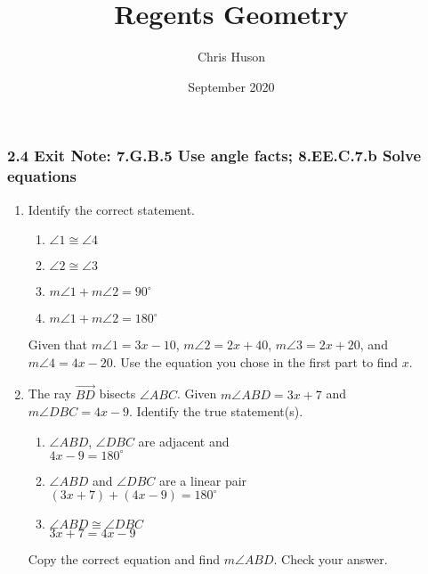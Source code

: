 \documentclass[12pt, twoside]{article}
\title{Regents Geometry}
\author{Chris Huson}
\date{September 2020}
\begin{document}
\subsubsection*{2.4 Exit Note: 7.G.B.5 Use angle facts; 8.EE.C.7.b Solve equations}
\begin{enumerate}
\item Identify the correct statement.
  \begin{multicols}{2}
    \begin{enumerate}
      \item $\angle 1 \cong \angle 4$
      \item $\angle 2 \cong \angle 3$
      \item $m\angle 1 + m\angle 2=90^\circ$
      \item $m\angle 1 + m\angle 2=180^\circ$
  \end{enumerate}
  \begin{center}
  \end{center}
\end{multicols} 
Given that $m\angle 1=3x-10$, $m\angle 2=2x+40$, $m\angle 3=2x+20$, and $m\angle 4=4x-20$. Use the equation you chose in the first part to find $x$.
\vspace{6cm}

\item The ray $\overrightarrow{BD}$ bisects $\angle ABC$. Given $m\angle ABD = 3x+7$ and \\$m\angle DBC = 4x-9$. Identify the true statement(s).
 \begin{multicols}{2}
    \begin{enumerate}
      \item $\angle ABD$, $\angle DBC$ are adjacent and\\
      $4x-9 =180^\circ$
      \item $\angle ABD$ and $\angle DBC$ are a linear pair\\
      $(3x+7) + (4x-9)=180^\circ$
      \item $\angle ABD \cong \angle DBC$\\
      $3x+7 = 4x-9$
  \end{enumerate}
  \begin{center}
  \end{center}
\end{multicols}
Copy the correct equation and find $m\angle ABD$. Check your answer. 


\end{enumerate}
\end{document}
